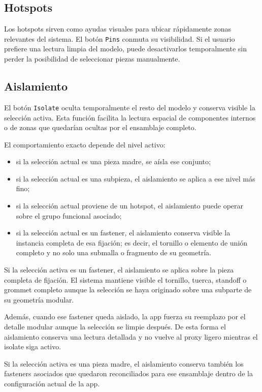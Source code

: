 \documentclass[12pt,letterpaper]{article}
\begin{document}
\subsection{Hotspots}
Los hotspots sirven como ayudas visuales para ubicar rápidamente zonas relevantes del sistema. El botón \texttt{Pins} conmuta su visibilidad. Si el usuario prefiere una lectura limpia del modelo, puede desactivarlos temporalmente sin perder la posibilidad de seleccionar piezas manualmente.

\subsection{Aislamiento}
El botón \texttt{Isolate} oculta temporalmente el resto del modelo y conserva visible la selección activa. Esta función facilita la lectura espacial de componentes internos o de zonas que quedarían ocultas por el ensamblaje completo.

\noindent El comportamiento exacto depende del nivel activo:
\begin{itemize}
    \item si la selección actual es una pieza madre, se aísla ese conjunto;
    \item si la selección actual es una subpieza, el aislamiento se aplica a ese nivel más fino;
    \item si la selección actual proviene de un hotspot, el aislamiento puede operar sobre el grupo funcional asociado;
    \item si la selección actual es un fastener, el aislamiento conserva visible la instancia completa de esa fijación; es decir, el tornillo o elemento de unión completo y no solo una submalla o fragmento de su geometría.
\end{itemize}

\noindent Si la selección activa es un fastener, el aislamiento se aplica sobre la pieza completa de fijación. El sistema mantiene visible el tornillo, tuerca, standoff o grommet completo aunque la selección se haya originado sobre una subparte de su geometría modular.

\noindent Además, cuando ese fastener queda aislado, la app fuerza su reemplazo por el detalle modular aunque la selección se limpie después. De esta forma el aislamiento conserva una lectura detallada y no vuelve al proxy ligero mientras el isolate siga activo.

\noindent Si la selección activa es una pieza madre, el aislamiento conserva también los fasteners asociados que quedaron reconciliados para ese ensamblaje dentro de la configuración actual de la app.
\end{document}
